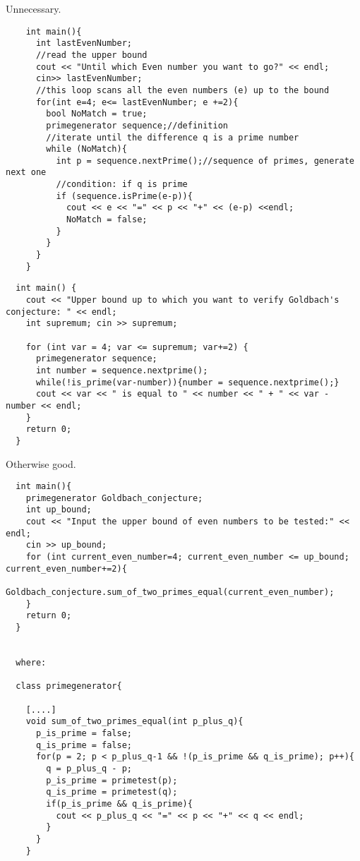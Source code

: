 Unnecessary.


\begin{lstlisting}
    int main(){
      int lastEvenNumber;
      //read the upper bound
      cout << "Until which Even number you want to go?" << endl;
      cin>> lastEvenNumber;
      //this loop scans all the even numbers (e) up to the bound
      for(int e=4; e<= lastEvenNumber; e +=2){
        bool NoMatch = true;
        primegenerator sequence;//definition
        //iterate until the difference q is a prime number
        while (NoMatch){
          int p = sequence.nextPrime();//sequence of primes, generate next one
          //condition: if q is prime
          if (sequence.isPrime(e-p)){
            cout << e << "=" << p << "+" << (e-p) <<endl;
            NoMatch = false;
          }
        }
      }
    }
\end{lstlisting}


\begin{lstlisting}
  int main() {
    cout << "Upper bound up to which you want to verify Goldbach's conjecture: " << endl;
    int supremum; cin >> supremum;

    for (int var = 4; var <= supremum; var+=2) {
      primegenerator sequence;
      int number = sequence.nextprime();
      while(!is_prime(var-number)){number = sequence.nextprime();}
      cout << var << " is equal to " << number << " + " << var - number << endl;
    }
    return 0;
  }
\end{lstlisting}

Otherwise good.


\begin{lstlisting}
  int main(){
    primegenerator Goldbach_conjecture;
    int up_bound;
    cout << "Input the upper bound of even numbers to be tested:" << endl;
    cin >> up_bound;
    for (int current_even_number=4; current_even_number <= up_bound; current_even_number+=2){
      Goldbach_conjecture.sum_of_two_primes_equal(current_even_number);
    }
    return 0;
  }


  where:

  class primegenerator{

    [....]
    void sum_of_two_primes_equal(int p_plus_q){
      p_is_prime = false;
      q_is_prime = false;
      for(p = 2; p < p_plus_q-1 && !(p_is_prime && q_is_prime); p++){
        q = p_plus_q - p;
        p_is_prime = primetest(p);
        q_is_prime = primetest(q);
        if(p_is_prime && q_is_prime){
          cout << p_plus_q << "=" << p << "+" << q << endl;
        }
      }
    }
\end{lstlisting}
